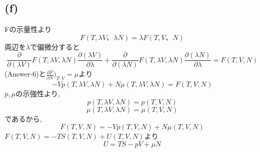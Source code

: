 \subsection*{(f)}
Fの示量性より
\[F(T,\lambda V、\lambda N)  =  \lambda F(T,V、N)\]
両辺を$\lambda$で偏微分すると
\[\frac{\partial}{\partial (\lambda V)} F(T,\lambda V,\lambda N) \frac{\partial (\lambda V)}{\partial \lambda }
+ \frac{\partial}{\partial (\lambda N)} F(T,\lambda V,\lambda N) \frac{\partial (\lambda N)}{\partial \lambda }
=F(T,V,N)\]
(Answer-6)と$\frac{\partial F}{\partial N}\big)_{T,V} = \mu$より
\[-V p(T,\lambda V,\lambda N) + N \mu(T,\lambda V,\lambda N) = F(T,V,N)\]
$p,\mu$の示強性より,
\[p(T,\lambda V,\lambda N) = p(T,V,N)\]
\[\mu(T,\lambda V,\lambda N) = \mu(T,V,N)\]
であるから,
\[F(T,V,N) = -V p(T,V,N) + N \mu(T, V, N) \]
$F(T,V,N) = -TS(T,V,N) + U(T,V,N) $より
\[U=TS - pV + \mu N\]
